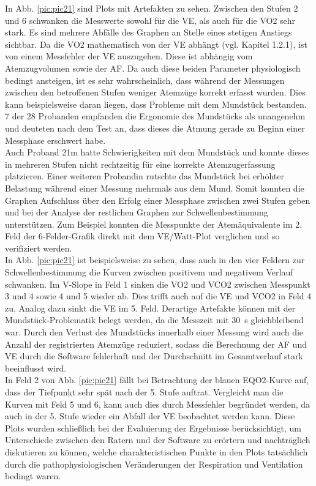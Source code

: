 In Abb. \ref{pic:pic21} sind Plots mit Artefakten zu sehen. Zwischen den Stufen 2 und 6 schwanken die Messwerte sowohl für die \acs{VE}, als auch für die \acs{VO2} sehr stark. Es sind mehrere Abfälle des Graphen an Stelle eines stetigen Anstiegs sichtbar. Da die \acs{VO2} mathematisch von der \acs{VE} abhängt (vgl. Kapitel 1.2.1), ist von einem Messfehler der \acs{VE} auszugehen. Diese ist abhängig vom Atemzugvolumen sowie der \acs{AF}. Da auch diese beiden Parameter physiologisch bedingt ansteigen, ist es sehr wahrscheinlich, dass während der Messungen zwischen den betroffenen Stufen weniger Atemzüge korrekt erfasst wurden. Dies kann beispielsweise daran liegen, dass Probleme mit dem Mundstück bestanden. 7 der 28 Probanden empfanden die Ergonomie des Mundstücks als unangenehm und deuteten nach dem Test an, dass dieses die Atmung gerade zu Beginn einer Messphase erschwert habe.\\
Auch Proband 21m hatte Schwierigkeiten mit dem Mundstück und konnte dieses in mehreren Stufen nicht rechtzeitig für eine korrekte Atemzugerfassung platzieren. Einer weiteren Probandin rutschte das Mundstück bei erhöhter Belastung während einer Messung mehrmals aus dem Mund. Somit konnten die Graphen Aufschluss über den Erfolg einer Messphase zwischen zwei Stufen geben und bei der Analyse der restlichen Graphen zur Schwellenbestimmung unterstützen. Zum Beispiel konnten die Messpunkte der Atemäquivalente im 2. Feld der 6-Felder-Grafik direkt mit dem \acs{VE}/Watt-Plot verglichen und so verifiziert werden.\\
In Abb. \ref{pic:pic21} ist beispielsweise zu sehen, dass auch in den vier Feldern zur Schwellenbestimmung die Kurven zwischen positivem und negativem Verlauf schwanken. Im V-Slope in Feld 1 sinken die \acs{VO2} und \acs{VCO2} zwischen Messpunkt 3 und 4 sowie 4 und 5 wieder ab. Dies trifft auch auf die \acs{VE} und \acs{VCO2} in Feld 4 zu. Analog dazu sinkt die \acs{VE} im 5. Feld. Derartige Artefakte können mit der Mundstück-Problematik belegt werden, da die Messzeit mit \SI{30}{\second} gleichbleibend war. Durch den Verlust des Mundstücks innerhalb einer Messung wird auch die Anzahl der registrierten Atemzüge reduziert, sodass die Berechnung der \acs{AF} und \acs{VE} durch die Software fehlerhaft und der Durchschnitt im Gesamtverlauf stark beeinflusst wird.\\
In Feld 2 von Abb. \ref{pic:pic21} fällt bei Betrachtung der blauen \acs{EQO2}-Kurve auf, dass der Tiefpunkt sehr spät nach der 5. Stufe auftrat. Vergleicht man die Kurven mit Feld 5 und 6, kann auch dies durch Messfehler begründet werden, da auch in der 5. Stufe wieder ein Abfall der \acs{VE} beobachtet werden kann. Diese Plots wurden schließlich bei der Evaluierung der Ergebnisse berücksichtigt, um Unterschiede zwischen den Ratern und der Software zu erörtern und nachträglich diskutieren zu können, welche charakteristischen Punkte in den Plots tatsächlich durch die pathophysiologischen Veränderungen der Respiration und Ventilation bedingt waren.

